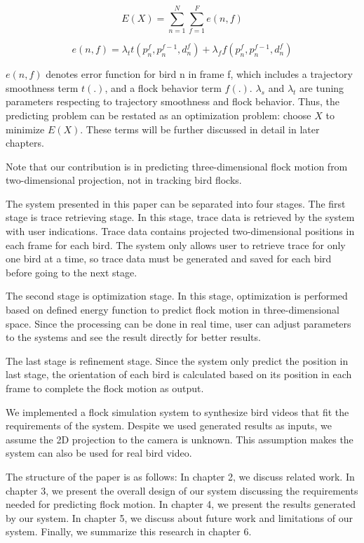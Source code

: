 \begin{equation}\label{eq:1}
 E(X) = \sum_{n = 1}^{N} \sum_{f = 1}^{F}e(n,f)
\end{equation}


\begin{equation}\label{eq:2}
 e(n,f) = \lambda_tt(p_n^f, p_n^{f-1},d_n^f) + \lambda_ff(p_n^f, p_n^{f-1},d_n^f)
\end{equation}


$e(n,f)$ denotes error function for bird n in frame f, which includes a trajectory smoothness term $t(.)$, and a flock behavior term $f(.)$. $\lambda_s$ and $\lambda_t$ are tuning parameters respecting to trajectory smoothness and flock behavior. Thus, the predicting problem can be restated as an optimization problem: choose $X$ to minimize $E(X)$. These terms will be further discussed in detail in later chapters.


Note that our contribution is in predicting three-dimensional flock motion from two-dimensional projection, not in tracking bird flocks.


The system presented in this paper can be separated into four stages. The first stage is trace retrieving stage. In this stage, trace data is retrieved by the system with user indications. Trace data contains projected two-dimensional positions in each frame for each bird. The system only allows user to retrieve trace for only one bird at a time, so trace data must be generated and saved for each bird before going to the next stage.


The second stage is optimization stage. In this stage, optimization is performed based on defined energy function to predict flock motion in three-dimensional space. Since the processing can be done in real time, user can adjust parameters to the systems and see the result directly for better results.


The last stage is refinement stage. Since the system only predict the position in last stage, the orientation of each bird is calculated based on its position in each frame to complete the flock motion as output.


We implemented a flock simulation system to synthesize bird videos that fit the requirements of the system. Despite we used generated results as inputs, we assume the 2D projection to the camera is unknown. This assumption makes the system can also be used for real bird video.


The structure of the paper is as follows: In chapter 2, we discuss related work. In chapter 3, we present the overall design of our system discussing the requirements needed for predicting flock motion. In chapter 4, we present the results generated by our system. In chapter 5, we discuss about future work and limitations of our system. Finally, we summarize this research in chapter 6.

